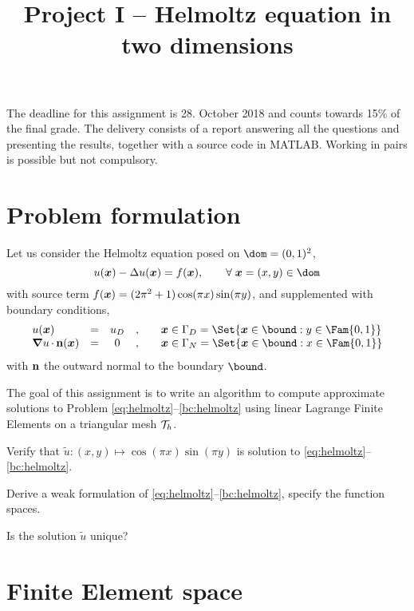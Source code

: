 \documentclass[assignment]{tmanotes}
\title{Project I -- Helmoltz equation in two dimensions}
\date{}
\begin{document}
\maketitle

The deadline for this assignment is 28. October 2018 and counts towards 15\% of the final grade.
The delivery consists of a report answering all the questions and presenting the results, together with a source code in MATLAB.
Working in pairs is possible but not compulsory.

\section{Problem formulation}

Let us consider the Helmoltz equation posed on $\dom = (0,1)^2$,
\begin{equation}\label{eq:helmoltz}
u(\xx) - \Delta u(\xx) = f(\xx), \qquad \forany \xx = (x,y)\in\dom
\end{equation}
with source term $f({{\boldsymbol x}}) = (2\pi^2 + 1)\cos(\pi x)\sin(\pi y)$, and supplemented with boundary conditions,
\begin{equation}\label{bc:helmoltz}
\begin{array}{lcccl}
u(\xx)              &=& u_D &,&\quad \xx\in\Gamma_D = \Set{\xx\in\bound : y \in \Fam{0,1}}\\
\Grad u\xDot\n(\xx) &=& 0   &,&\quad \xx\in\Gamma_N = \Set{\xx\in\bound : x \in \Fam{0,1}}\\
\end{array}
\end{equation}
with $\mathbf n$ the outward normal to the boundary $\bound$.

\medskip
The goal of this assignment is to write an algorithm to compute approximate solutions to Problem \eqref{eq:helmoltz}--\eqref{bc:helmoltz} using linear Lagrange Finite Elements on a triangular mesh ${\mathcal T}_h$.

\medskip
\begin{tmatsks}
\item Verify that $\tilde u: (x,y) \mapsto \cos(\pi x)\sin(\pi y)$ is solution to \eqref{eq:helmoltz}--\eqref{bc:helmoltz}.
\item Derive a weak formulation of \eqref{eq:helmoltz}--\eqref{bc:helmoltz}, specify the function spaces.
\item Is the solution $\tilde u$ unique?
\end{tmatsks}

\section{Finite Element space}
\end{document}
